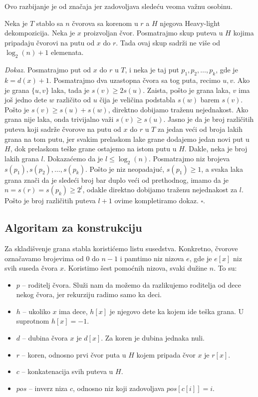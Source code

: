 Ovo razbijanje je od zna\v caja jer zadovoljava slede\' cu veoma va\v znu osobinu.

\begin{thm}
\label{teoremalakegrane}
Neka je $T$ stablo sa $n$ \v cvorova sa korenom u $r$ a $H$ njegova Heavy-light dekompozicija. Neka je $x$ proizvoljan \v cvor. Posmatrajmo skup puteva u $H$ kojima pripadaju \v cvorovi na putu od $x$ do $r$. Tada ovaj skup sadr\v zi ne vi\v se od $\log_2(n) + 1$ elemenata.
\end{thm}

\textit{Dokaz.} Posmatrajmo put od $x$ do $r$ u $T$, i neka je taj put $p_1, p_2, \ldots, p_k$, gde je $k = d(x)+1$. Posmatrajmo dva uzastopna \v cvora sa tog puta, recimo $u,v$. Ako je grana $\{u,v\}$ laka, tada je $s(v) \geq 2s(u)$. Zaista, po\v sto je grana laka, $v$ ima jo\v s jedno dete $w$ razli\v cito od $u$ \v cija je veli\v cina podstabla $s(w)$ barem $s(v)$. Po\v sto je $s(v) \geq s(u) + s(w)$, direktno dobijamo tra\v zenu nejednakost. Ako grana nije laka, onda trivijalno va\v zi $s(v) \geq s(u)$. Jasno je da je broj razli\v citih puteva koji sadr\v ze \v cvorove na putu od $x$ do $r$ u $T$ za jedan ve\' ci od broja lakih grana na tom putu, jer svakim prelaskom lake grane dodajemo jedan novi put u $H$, dok prelaskom te\v ske grane ostajemo na istom putu u $H$. Dakle, neka je broj lakih grana $l$. Dokaza\' cemo da je $l \leq \log_2(n)$. Posmatrajmo niz brojeva $s(p_1), s(p_2), \ldots, s(p_k)$. Po\v sto je niz neopadaju\' c, $s(p_1) \geq 1$, a svaka laka grana zna\v ci da je slede\' ci broj bar duplo ve\' ci od prethodnog, imamo da je $n = s(r) = s(p_k) \geq 2^l$, odakle direktno dobijamo tra\v zenu nejednakost za $l$. Po\v sto je broj razli\v citih puteva $l+1$ ovime kompletiramo dokaz. \hfill $\square$.

\subsection{Algoritam za konstrukciju}

Za skladi\v svenje grana stabla koristi\' cemo listu susedstva. Konkretno, \v cvorove ozna\v cavamo brojevima od $0$ do $n-1$ i pamtimo niz nizova $e$, gde je $e[x]$ niz svih suseda \v cvora $x$. 
Koristimo \v sest pomo\' cnih nizova, svaki du\v zine $n$. To su:

\begin{itemize}
\item $p$ -- roditelj \v cvora. Slu\v zi nam da mo\v zemo da razlikujemo roditelja od dece nekog \v cvora, jer rekurziju radimo samo ka deci.
\item $h$ -- ukoliko $x$ ima dece, $h[x]$ je njegovo dete ka kojem ide te\v ska grana. U suprotnom $h[x] = -1$.
\item $d$ -- dubina \v cvora $x$ je $d[x]$. Za koren je dubina jednaka nuli.
\item $r$ -- koren, odnosno prvi \v cvor puta u $H$ kojem pripada \v cvor $x$ je $r[x]$.
\item $c$ -- konkatenacija svih puteva u $H$.
\item $pos$ -- inverz niza $c$, odnosno niz koji zadovoljava $pos[c[i]] = i$.
\end{itemize}

